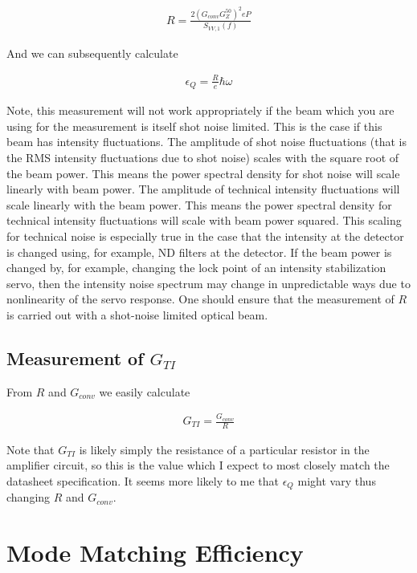 \documentclass[12pt]{article}
\newcommand{\ep}{\epsilon}
\begin{document}
\begin{align}
R = \frac{2\left(G_{conv}G_Z^{50}\right)^2 e P}{S_{VV,1}(f)}
\end{align}


And we can subsequently calculate

\begin{align}
\ep_Q = \frac{R}{e} \hbar \omega
\end{align}

Note, this measurement will not work appropriately if the beam which you are using for the measurement is itself shot noise limited.
This is the case if this beam has intensity fluctuations.
The amplitude of shot noise fluctuations (that is the RMS intensity fluctuations due to shot noise) scales with the square root of the beam power.
This means the power spectral density for shot noise will scale linearly with beam power.
The amplitude of technical intensity fluctuations will scale linearly with the beam power.
This means the power spectral density for technical intensity fluctuations will scale with beam power squared.
This scaling for technical noise is especially true in the case that the intensity at the detector is changed using, for example, ND filters at the detector.
If the beam power is changed by, for example, changing the lock point of an intensity stabilization servo, then the intensity noise spectrum may change in unpredictable ways due to nonlinearity of the servo response.
One should ensure that the measurement of $R$ is carried out with a shot-noise limited optical beam.

\subsection{Measurement of $G_{TI}$}

From $R$ and $G_{conv}$ we easily calculate 

\begin{align}
G_{TI} = \frac{G_{conv}}{R}
\end{align}

Note that $G_{TI}$ is likely simply the resistance of a particular resistor in the amplifier circuit, so this is the value which I expect to most closely match the datasheet specification.
It seems more likely to me that $\ep_Q$ might vary thus changing $R$ and $G_{conv}$.

\section{Mode Matching Efficiency}
\end{document}
